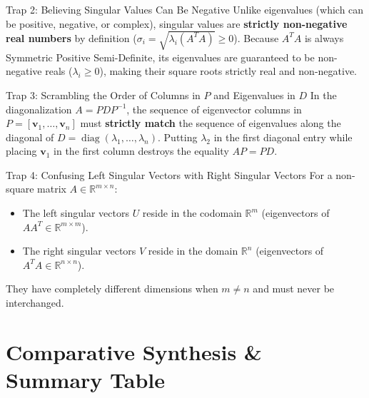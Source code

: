 \begin{trapbox}{Trap 2: Believing Singular Values Can Be Negative}
Unlike eigenvalues (which can be positive, negative, or complex), singular values are \textbf{strictly non-negative real numbers} by definition ($\sigma_i = \sqrt{\lambda_i(A^T A)} \ge 0$). Because $A^T A$ is always Symmetric Positive Semi-Definite, its eigenvalues are guaranteed to be non-negative reals ($\lambda_i \ge 0$), making their square roots strictly real and non-negative.
\end{trapbox}

\begin{trapbox}{Trap 3: Scrambling the Order of Columns in $P$ and Eigenvalues in $D$}
In the diagonalization $A = P D P^{-1}$, the sequence of eigenvector columns in $P = [\mathbf{v}_1, \dots, \mathbf{v}_n]$ must \textbf{strictly match} the sequence of eigenvalues along the diagonal of $D = \operatorname{diag}(\lambda_1, \dots, \lambda_n)$. Putting $\lambda_2$ in the first diagonal entry while placing $\mathbf{v}_1$ in the first column destroys the equality $A P = P D$.
\end{trapbox}

\begin{trapbox}{Trap 4: Confusing Left Singular Vectors with Right Singular Vectors}
For a non-square matrix $A \in \mathbb{R}^{m \times n}$:
\begin{itemize}
    \item The left singular vectors $U$ reside in the codomain $\mathbb{R}^m$ (eigenvectors of $A A^T \in \mathbb{R}^{m \times m}$).
    \item The right singular vectors $V$ reside in the domain $\mathbb{R}^n$ (eigenvectors of $A^T A \in \mathbb{R}^{n \times n}$).
\end{itemize}
They have completely different dimensions when $m \neq n$ and must never be interchanged.
\end{trapbox}

\section{Comparative Synthesis \& Summary Table}

